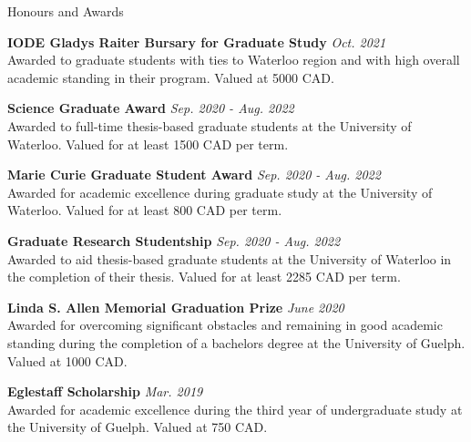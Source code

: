 \documentclass{resume} %
\begin{document}
\begin{rSection}{Honours and Awards}

{\bf{IODE Gladys Raiter Bursary for Graduate Study}}
\hfill\textit{{Oct. 2021}}\\
Awarded to graduate students with ties to Waterloo region and with high overall academic standing in their program. Valued at 5000 CAD.

{\bf{Science Graduate Award}}
\hfill\textit{{Sep. 2020 - Aug. 2022}}\\
Awarded to full-time thesis-based graduate students at the University of Waterloo. Valued for at least 1500 CAD per term.

{\bf{Marie Curie Graduate Student Award}}
\hfill\textit{{Sep. 2020 - Aug. 2022}}\\
Awarded for academic excellence during graduate study at the University of Waterloo. Valued for at least 800 CAD per term.

{\bf{Graduate Research Studentship}}
\hfill\textit{{Sep. 2020 - Aug. 2022}}\\
Awarded to aid thesis-based graduate students at the University of Waterloo in the completion of their thesis. Valued for at least 2285 CAD per term.

{\bf{Linda S. Allen Memorial Graduation Prize}}
\hfill\textit{{June 2020}}\\
Awarded for overcoming significant obstacles and remaining in good academic standing during the completion of a bachelors degree at the University of Guelph. Valued at 1000 CAD.

{\bf{Eglestaff Scholarship}}
\hfill\textit{{Mar. 2019}}\\
Awarded for academic excellence during the third year of undergraduate study at the University of Guelph. Valued at 750 CAD.

\end{rSection}

\vspace{1em}
\end{document}
